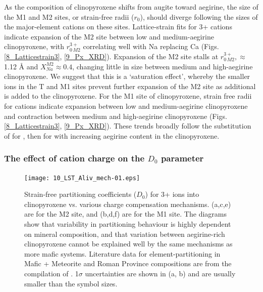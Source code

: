 \documentclass[review,authoryear,12pt]{elsarticle}
\begin{document}
	As the composition of clinopyroxene shifts from augite toward aegirine, the size of the M1 and M2 sites, or strain-free radii ($r_0$), should diverge following the sizes of the major-element cations on these sites.
	Lattice-strain fits for 3+ cations indicate expansion of the M2 site between low and medium-aegirine clinopyroxene, with $r_{0\, M2}^{3+}$ correlating well with Na replacing Ca (Figs. \ref{8_Latticestrain3}, \ref{9_Px_XRD}). Expansion of the M2 site stalls at $r_{0\, M2}^{3+}, \approx$ 1.12 \si{\angstrom}{} and $X_{Na}^{M2} \approx 0.4$, changing little in size between medium and high-aegirine clinopyroxene. We suggest that this is a `saturation effect', whereby the smaller ions in the T and M1 sites prevent further expansion of the M2 site as additional  is added to the clinopyroxene. 	
	For the M1 site of clinopyroxene, strain free radii for  cations indicate expansion between low and medium-aegirine clinopyroxene and contraction between medium and high-aegirine clinopyroxene (Figs. \ref{8_Latticestrain3}, \ref{9_Px_XRD}). These trends broadly follow the substitution of  for , then  for  with increasing aegirine content in the clinopyroxene.
	


\subsubsection{The effect of cation charge on the $D_0$ parameter}
 \begin{figure}[htp]
        \begin{center}
        \texttt{[image: 10\_LST\_Aliv\_mech-01.eps]}
        
        \caption[Strain-free partition coefficients ($D_0$) for 3+ ions into clinopyroxene vs. various charge compensation mechanisms.]{Strain-free partitioning coefficients ($D_0$) for 3+ ions into clinopyroxene vs. various charge compensation mechanisms. (a,c,e) are for the M2 site, and (b,d,f) are for the M1 site. The diagrams show that variability in partitioning behaviour is highly dependent on mineral composition, and that variation between aegirine-rich clinopyroxene cannot be explained well by the same mechanisms as more mafic systems. Literature data for element-partitioning in Mafic + Meteorite and Roman Province compositions are from the compilation of \citet{Bedard2014}. 1$\sigma$ uncertainties are shown in (a, b) and are usually smaller than the symbol sizes.}
        \label{10_D0_Mech}
        \end{center}
        \end{figure}
\end{document}
